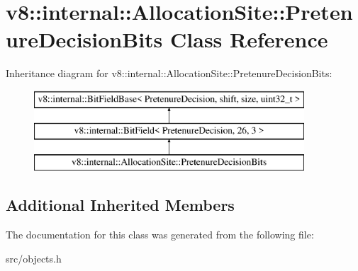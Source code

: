 \hypertarget{classv8_1_1internal_1_1_allocation_site_1_1_pretenure_decision_bits}{}\section{v8\+:\+:internal\+:\+:Allocation\+Site\+:\+:Pretenure\+Decision\+Bits Class Reference}
\label{classv8_1_1internal_1_1_allocation_site_1_1_pretenure_decision_bits}
Inheritance diagram for v8\+:\+:internal\+:\+:Allocation\+Site\+:\+:Pretenure\+Decision\+Bits\+:\begin{figure}[H]
\begin{center}
\leavevmode
\includegraphics[height=3.000000cm]{classv8_1_1internal_1_1_allocation_site_1_1_pretenure_decision_bits}
\end{center}
\end{figure}
\subsection*{Additional Inherited Members}


The documentation for this class was generated from the following file\+:\begin{DoxyCompactItemize}
\item 
src/objects.\+h\end{DoxyCompactItemize}
